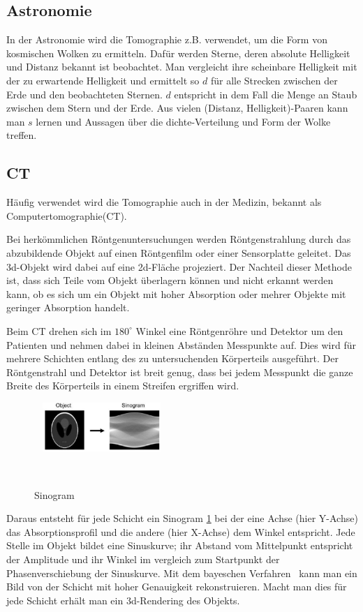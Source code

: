 \documentclass[]{dsadokumentation}
\begin{document}
\subsection{Astronomie}

In der Astronomie wird die Tomographie z.B. verwendet, um die Form von kosmischen Wolken zu ermitteln. Dafür werden Sterne, deren absolute Helligkeit und Distanz bekannt ist beobachtet. Man vergleicht ihre scheinbare Helligkeit mit der zu erwartende Helligkeit und ermittelt so $d$ für alle Strecken zwischen der Erde und den beobachteten Sternen. $d$ entspricht in dem Fall die Menge an Staub zwischen dem Stern und der Erde. Aus vielen (Distanz, Helligkeit)-Paaren kann man $s$ lernen und Aussagen über die dichte-Verteilung und Form der Wolke treffen.

\subsection{CT}

Häufig verwendet wird die Tomographie auch in der Medizin, bekannt als Computertomographie(CT).

Bei herkömmlichen Röntgenuntersuchungen werden Röntgenstrahlung durch das abzubildende Objekt auf einen Röntgenfilm oder einer Sensorplatte geleitet. Das 3d-Objekt wird dabei auf eine 2d-Fläche projeziert. Der Nachteil dieser Methode ist, dass sich Teile vom Objekt überlagern können und nicht erkannt werden kann, ob es sich um ein Objekt mit hoher Absorption oder mehrer Objekte mit geringer Absorption handelt.

Beim CT drehen sich im $180^\circ$ Winkel eine Röntgenröhre und Detektor um den Patienten und nehmen dabei in kleinen Abständen Messpunkte auf. Dies wird für mehrere Schichten entlang des zu untersuchenden Körperteils ausgeführt. Der Röntgenstrahl und Detektor ist breit genug, dass bei jedem Messpunkt die ganze Breite des Körperteils in einem Streifen ergriffen wird.

\begin{figure}
  \includegraphics[width=0.4\textwidth]{k4.2/backprojektion.png}
  \caption{Sinogram}
  \label{k4.2.tomo.ct.bp}
\end{figure}

Daraus entsteht für jede Schicht ein Sinogram \cref{k4.2.tomo.ct.bp} bei der eine Achse (hier Y-Achse) das Absorptionsprofil und die andere (hier X-Achse) dem Winkel entspricht. Jede Stelle im Objekt bildet eine Sinuskurve; ihr Abstand vom Mittelpunkt entspricht der Amplitude und ihr Winkel im vergleich zum Startpunkt der Phasenverschiebung der Sinuskurve. Mit dem bayeschen Verfahren  kann man ein Bild von der Schicht mit hoher Genauigkeit rekonstruieren. Macht man dies für jede Schicht erhält man ein 3d-Rendering des Objekts.
\end{document}
